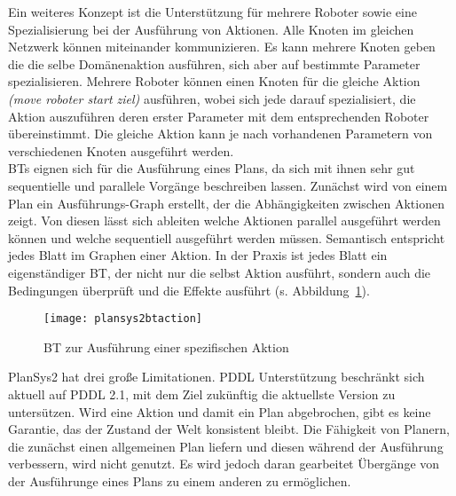 Ein weiteres Konzept ist die Unterstützung für mehrere Roboter sowie eine Spezialisierung bei der Ausführung von Aktionen.
Alle Knoten im gleichen Netzwerk können miteinander kommunizieren.
Es kann mehrere Knoten geben die die selbe Domänenaktion ausführen, sich aber auf bestimmte Parameter spezialisieren.
Mehrere Roboter können einen Knoten für die gleiche Aktion \emph{(move roboter start ziel)} ausführen, wobei sich jede darauf spezialisiert, die Aktion auszuführen deren erster Parameter mit dem entsprechenden Roboter übereinstimmt.
Die gleiche Aktion kann je nach vorhandenen Parametern von verschiedenen Knoten ausgeführt werden.\\
\acp{BT} eignen sich für die Ausführung eines Plans, da sich mit ihnen sehr gut sequentielle und parallele Vorgänge beschreiben lassen.
Zunächst wird von einem Plan ein Ausführungs-Graph erstellt, der die Abhängigkeiten zwischen Aktionen zeigt.
Von diesen lässt sich ableiten welche Aktionen parallel ausgeführt werden können und welche sequentiell ausgeführt werden müssen.
Semantisch entspricht jedes Blatt im Graphen einer Aktion.
In der Praxis ist jedes Blatt ein eigenständiger \ac{BT}, der nicht nur die selbst Aktion ausführt, sondern auch die Bedingungen überprüft und die Effekte ausführt (s. Abbildung~\ref{fig:plansysbtaction}).\\
\begin{figure}
    \centering
    \texttt{[image: plansys2btaction]}
    \caption{\ac{BT} zur Ausführung einer spezifischen Aktion~\cite{plansys}}
    \label{fig:plansysbtaction}
    \end{figure}
\ac{PlanSys2} hat drei große Limitationen.
\ac{PDDL} Unterstützung beschränkt sich aktuell auf \ac{PDDL} 2.1, mit dem Ziel zukünftig die aktuellste Version zu untersützen.
Wird eine Aktion und damit ein Plan abgebrochen, gibt es keine Garantie, das der Zustand der Welt konsistent bleibt.
Die Fähigkeit von Planern, die zunächst einen allgemeinen Plan liefern und diesen während der Ausführung verbessern, wird nicht genutzt.
Es wird jedoch daran gearbeitet Übergänge von der Ausführunge eines Plans zu einem anderen zu ermöglichen.